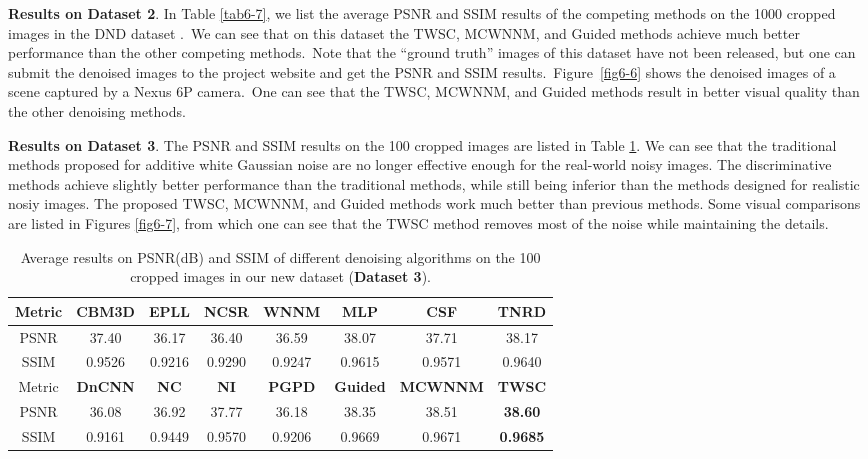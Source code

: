 \textbf{Results on Dataset 2}. In Table \ref{tab6-7}, we list the average PSNR and SSIM results of the competing methods on the 1000 cropped images in the DND dataset \cite{dnd2017}.\ We can see that on this dataset the TWSC, MCWNNM, and Guided methods achieve much better performance than the other competing methods.\ Note that the ``ground truth'' images of this dataset have not been released, but one can submit the denoised images to the project website and get the PSNR and SSIM results.\ Figure\ \ref{fig6-6} shows the denoised images of a scene captured by a Nexus 6P camera.\ One can see that the TWSC, MCWNNM, and Guided methods result in better visual quality than the other denoising methods.

\textbf{Results on Dataset 3}.
The PSNR and SSIM \cite{ssim} results on the 100 cropped images are listed in Table \ref{tab6-8}. We can see that the traditional methods proposed for additive white Gaussian noise are no longer effective enough for the real-world noisy images. The discriminative methods achieve slightly better performance than the traditional methods, while still being inferior than the methods designed for realistic nosiy images. The proposed TWSC, MCWNNM, and Guided methods work much better than previous methods. Some visual comparisons are listed in Figures \ref{fig6-7}, from which one can see that the TWSC method removes most of the noise while maintaining the details. 

\begin{table}[t!]
\caption{Average results on PSNR(dB) and SSIM of different denoising algorithms on the 100 cropped images in our new dataset (\textbf{Dataset 3}).}
\scriptsize
\label{tab6-8}
\begin{center}
\renewcommand\arraystretch{1.2}
\begin{tabular*}{1\textwidth}{@{\extracolsep{\fill}}cccccccc}
\hline
Metric
&
\textbf{CBM3D}
&
\textbf{EPLL}
&
\textbf{NCSR}
&
\textbf{WNNM}
&
\textbf{MLP}
&
\textbf{CSF}
&
\textbf{TNRD}
\\
\hline
PSNR & 37.40 & 36.17 & 36.40 & 36.59 & 38.07 & 37.71 & 38.17 
\\
\hline
SSIM & 0.9526 & 0.9216 & 0.9290 & 0.9247 & 0.9615 & 0.9571 & 0.9640
\\
\hline
Metric
&
\textbf{DnCNN}
&
\textbf{NC}
&
\textbf{NI}
&
\textbf{PGPD}
&
\textbf{Guided}
&
\textbf{MCWNNM}
&
\textbf{TWSC}
\\
\hline
PSNR & 36.08 & 36.92  &  37.77 & 36.18 & 38.35 & 38.51 & \textbf{38.60}
\\
\hline
SSIM & 0.9161 & 0.9449  & 0.9570  & 0.9206 & 0.9669 & 0.9671 & \textbf{0.9685}
\\
\hline
\end{tabular*}
\end{center}
\end{table}


